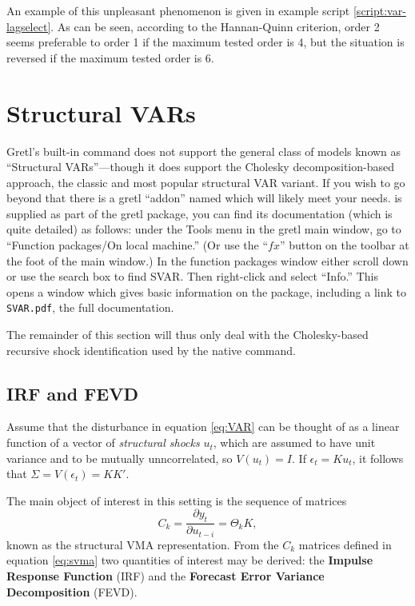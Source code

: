 An example of this unpleasant phenomenon is given in example script
\ref{script:var-lagselect}. As can be seen, according to the
Hannan-Quinn criterion, order 2 seems preferable to order 1 if the
maximum tested order is 4, but the situation is reversed if the
maximum tested order is 6.

\section{Structural VARs}
\label{sec:svar}

Gretl's built-in  command does not support the general class
of models known as ``Structural VARs''---though it does support the
Cholesky decomposition-based approach, the classic and most popular
structural VAR variant. If you wish to go beyond that there is a gretl ``addon''
named  which will likely meet your needs.  is
supplied as part of the gretl package, you can find its documentation
(which is quite detailed) as follows: under the \textsf{Tools} menu in
the gretl main window, go to ``Function packages/On local machine.''
(Or use the ``$fx$'' button on the toolbar at the foot of the main
window.) In the function packages window either scroll down or use the
search box to find \textsf{SVAR}. Then right-click and select
``Info.'' This opens a window which gives basic information on the
package, including a link to \texttt{SVAR.pdf}, the full
documentation.

The remainder of this section will thus only deal with the Cholesky-based
recursive shock identification used by the native  command.

\subsection{IRF and FEVD}

Assume that the disturbance in equation \eqref{eq:VAR} can be thought
of as a linear function of a vector of \emph{structural shocks} $u_t$,
which are assumed to have unit variance and to be mutually
unncorrelated, so $V(u_t) = I$. If $\epsilon_t = K u_t$, it follows
that $\Sigma = V(\epsilon_t) = KK'$.

The main object of interest in this setting is the sequence of
matrices
\begin{equation}
  \label{eq:svma}
  C_k = \frac{\partial y_t}{\partial u_{t-i}} = \Theta_k K, 
\end{equation}
known as the structural VMA representation. From the $C_k$ matrices
defined in equation \eqref{eq:svma} two quantities of interest may be
derived: the \textbf{Impulse Response Function} (IRF) and the
\textbf{Forecast Error Variance Decomposition} (FEVD).

